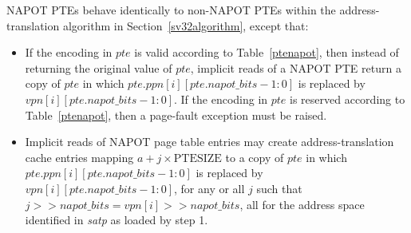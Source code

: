 NAPOT PTEs behave identically to non-NAPOT PTEs within the address-translation
algorithm in Section~\ref{sv32algorithm}, except that:
\begin{itemize}
  \item If the encoding in $pte$ is valid according to Table~\ref{ptenapot},
    then instead of returning the original value of $pte$, implicit reads of a
    NAPOT PTE return a copy of $pte$ in which $pte.ppn[i][pte.napot\_bits-1:0]$ is
    replaced by $vpn[i][pte.napot\_bits-1:0]$.  If the encoding in $pte$ is
    reserved according to Table~\ref{ptenapot}, then a page-fault exception
    must be raised.
  \item Implicit reads of NAPOT page table entries may create address-translation cache
    entries mapping $a + j \times \textrm{PTESIZE}$ to a copy of $pte$
    in which $pte.ppn[i][pte.napot\_bits-1:0]$ is replaced by
    $vpn[i][pte.napot\_bits-1:0]$, for any or all $j$ such that
    ${j >> napot\_bits}={vpn[i] >> napot\_bits}$, all for the address space identified
    in {\em satp} as loaded by step 1.
\end{itemize}

